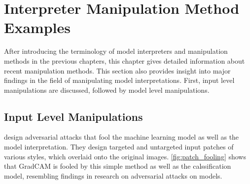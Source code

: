 \section{Interpreter Manipulation Method Examples}
\label{sec:manipulations}

After introducing the terminology of model interpreters and manipulation methods in the previous chapters, this chapter gives detailed information about recent manipulation methods. This section also provides insight into major findings in the field of manipulating model interpretations. First, input level manipulations are discussed, followed by model level manipulations. 



\subsection{Input Level Manipulations}

\newline
\cite{subramanya2019fooling} design adversarial attacks that fool the machine learning model as well as the model interpretation. 
They design targeted and untargeted input patches of various styles, which overlaid onto the original images. 
\autoref{fig:patch_fooling} shows that GradCAM is fooled by this simple method as well as the calssification model, resembling findings in research on adversarial attacks on models. 

